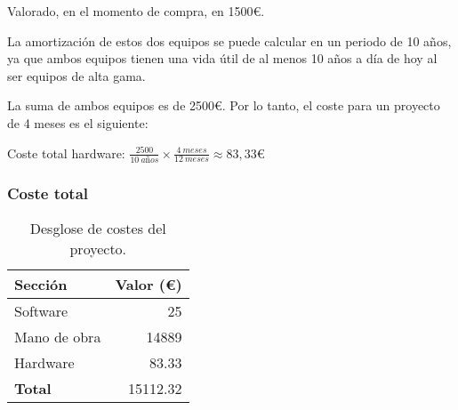 Valorado, en el momento de compra, en 1500€.

La amortización de estos dos equipos se puede calcular en un periodo de 10 años, ya que ambos equipos tienen una vida útil de al menos 10 años a día de hoy al ser equipos de alta gama.

La suma de ambos equipos es de 2500€. Por lo tanto, el coste para un proyecto de 4 meses es el siguiente:
\begin{center}
    Coste total hardware: \(\frac{2500}{10~años} \times \frac{4~meses}{12~meses} \approx 83,33\)€
\end{center}

\subsubsection{Coste total}
\begin{table}[h]
    \centering
        \begin{tabular}{|l|r|}
        \hline
        \textbf{Sección} & \textbf{Valor (€)} \\
        \hline
        Software & 25 \\
        Mano de obra & 14889 \\
        Hardware & 83.33 \\
        \hline
        \textbf{Total} & 15112.32 \\
        \hline
        \end{tabular}
    \caption{Desglose de costes del proyecto.}
    \label{tab:costes}
\end{table}